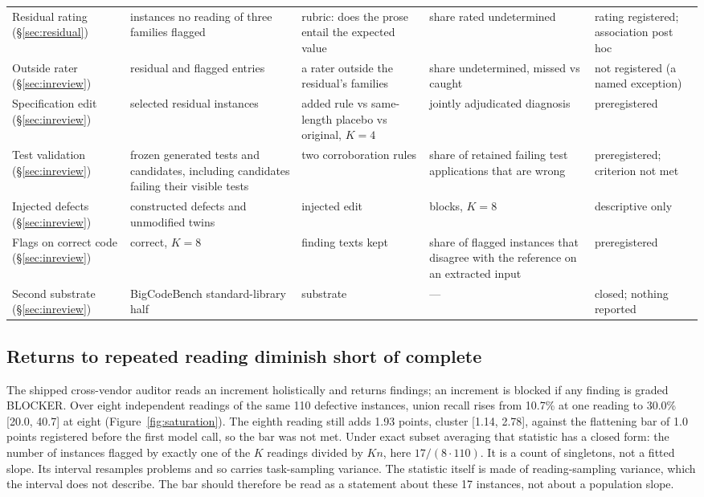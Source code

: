 \begin{table}[t]
\begin{tabular}{@{}>{\raggedright\arraybackslash}p{2.8cm}>{\raggedright\arraybackslash}p{3.1cm}>{\raggedright\arraybackslash}p{3.5cm}>{\raggedright\arraybackslash}p{3.0cm}>{\raggedright\arraybackslash}p{2.9cm}@{}}
Residual rating (\S\ref{sec:residual}) & 57 instances no reading of three families flagged & rubric: does the prose entail the expected value & share rated undetermined & rating registered; association post hoc \\
Outside rater (\S\ref{sec:inreview}) & 121 residual and flagged entries & a rater outside the residual's families & share undetermined, missed vs caught & not registered (a named exception) \\
Specification edit (\S\ref{sec:inreview}) & 32 selected residual instances & added rule vs same-length placebo vs original, $K=4$ & jointly adjudicated diagnosis & preregistered \\
Test validation (\S\ref{sec:inreview}) & frozen generated tests and candidates, including candidates failing their visible tests & two corroboration rules & share of retained failing test applications that are wrong & preregistered; criterion not met \\
Injected defects (\S\ref{sec:inreview}) & constructed defects and unmodified twins & injected edit & blocks, $K=8$ & descriptive only \\
Flags on correct code (\S\ref{sec:inreview}) & 150 correct, $K=8$ & finding texts kept & share of flagged instances that disagree with the reference on an extracted input & preregistered \\
Second substrate (\S\ref{sec:inreview}) & BigCodeBench standard-library half & substrate & --- & closed; nothing reported \\
\bottomrule
\end{tabular}
\end{table}

\subsection{Returns to repeated reading diminish short of complete}
\label{sec:repeat}

The shipped cross-vendor auditor reads an increment holistically and returns findings; an
increment is blocked if any finding is graded BLOCKER. Over eight independent readings of the same
110 defective instances, union recall rises from 10.7\% at one reading to 30.0\% [20.0, 40.7] at
eight (Figure~\ref{fig:saturation}). The eighth reading still adds 1.93 points, cluster [1.14,
2.78], against the flattening bar of 1.0 points registered before the first model call, so the bar
was not met. Under exact subset averaging that statistic has a closed form: the number of
instances flagged by exactly one of the $K$ readings divided by $K n$, here $17/(8\cdot110)$. It
is a count of singletons, not a fitted slope. Its interval resamples problems and so carries
task-sampling variance. The statistic itself is made of reading-sampling variance, which the
interval does not describe. The bar should therefore be read as a statement about these 17
instances, not about a population slope.

